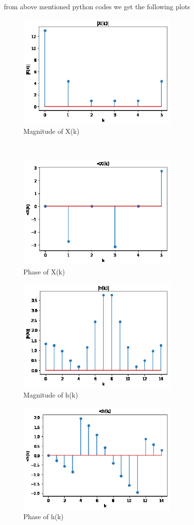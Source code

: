 \documentclass[journal,12pt,twocolumn]{IEEEtran}
\begin{document}
\newpage
from above mentioned python codes we get  the following plots\\
\begin{figure}[h!]
    \centering
    \includegraphics[width=8cm]{./figures/abs_X(k).eps}
    \caption{Magnitude of X(k)}
    \label{|X(k)|}
\end{figure} \\
\begin{figure}[h!]
    \centering
    \includegraphics[width=8cm]{./figures/angle_X(k).eps}
    \caption{Phase of X(k)}
    \label{/_X(k)}
\end{figure}
\begin{figure}[h!]
    \centering
    \includegraphics[width=8cm]{./figures/abs_h(k).eps}
    \caption{Magnitude of h(k)}
    \label{|h(k)|}
\end{figure} 
\newpage
\begin{figure}[h!]
    \centering
    \includegraphics[width=8cm]{./figures/angle_h(k).eps}
    \caption{Phase of h(k)}
    \label{/_X(k)}
\end{figure} 
\end{document}
